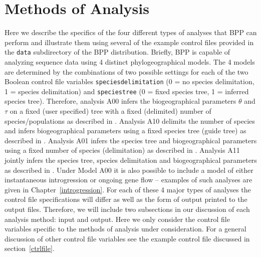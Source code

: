 \documentclass[a4paper]{book}
\numberwithin{equation}{section} \renewcommand{\baselinestretch}{0.55}
\begin{document}
 \chapter{Methods of Analysis} \label{analysismethods} Here we
 describe the specifics of the four different types of analyses that
 BPP can perform and illustrate them using several of
 the example control files provided in the
 \texttt{data} subdirectory of the BPP distribution. Briefly, BPP is
 capable of analyzing sequence data using 4 distinct phylogeographical
 models. The 4 models are determined by the combinations of two
 possible settings for each of the two Boolean control file variables
 \texttt{speciesdelimitation} (0 = no species delimitation, 1 =
 species delimitation) and \texttt{speciestree} (0 = fixed species
 tree, 1 = inferred species tree). Therefore, analysis A00 infers the
 biogeographical parameters $\theta$ and $\tau$ on a fixed (user
 specified) tree with a fixed (delimited) number of
 species/populations as described in \cite{Rannala2003}.  Analysis A10
 delimits the number of species and infers biogeographical parameters
 using a fixed species tree (guide tree) as described in
 \cite{Yang2010}.  Analysis A01 infers the species tree and
 biogeographical parameters using a fixed number of species
 (delimitation) as described in \cite{Rannala2017}.  Analysis A11
 jointly infers the species tree, species delimitation and
 biogeographical parameters as described in \cite{Yang2014a}. Under
 Model A00 it is also possible to include a model of either instantaneous
 introgression or ongoing gene flow -- examples of such analyses are given in
 Chapter~\ref{introgression}.
 For each
 of these 4 major types of analyses the control file specifications
 will differ as well as the form of output printed to the output
 files. Therefore, we will include two subsections in our discussion
 of each analysis method: input and output. Here we only consider the
 control file variables specific to the methods of analysis under
 consideration. For a general discussion of other control file
 variables see the example control file discussed in
 section~\ref{ctrlfile}.
\end{document}
